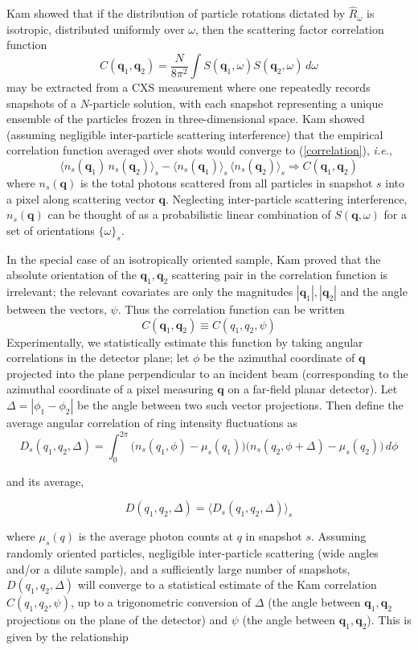 \documentclass [11pt,fleqn]{article}
\def \be {\begin{equation}}
\def \ee {\end{equation}}
\begin{document}
Kam showed that if the distribution of particle rotations dictated by $\hat{R}_\omega$ is isotropic, distributed uniformly over $\omega$, then the scattering factor correlation function
\be \label{correlation}
C(\bm q_1, \bm q_2) = \frac{N}{8 \pi^{2}}\int S( \bm q_{1},\omega ) S( \bm q_{2},\omega ) \, d \omega
\ee
may be extracted from a CXS measurement where one repeatedly records snapshots of a $N$-particle solution, with each snapshot representing a unique ensemble of the particles frozen in three-dimensional space. Kam showed (assuming negligible inter-particle scattering interference) that the empirical correlation function averaged over shots would converge to (\ref{correlation}), \textit{i.e.},
\be \label{converge}
\big \langle   n_s(\bm q_1)  \, n_s(\bm q_2) \big \rangle_s  - \big \langle {n}_s(\bm q_1) \big \rangle_s \, \big \langle {n}_s(\bm q_2) \big \rangle_s   \Rightarrow C(\bm q_1, \bm q_2) 
\ee
where $n_{s}(\bm q)$ is the total photons scattered from all particles in snapshot $s$ into a pixel along scattering vector $\bm q$. Neglecting inter-particle scattering interference, $n_{s}(\bm q)$ can be thought of as a probabilistic linear combination of $S(\bm q,\omega)$ for a set of orientations $\{ \omega\}_{s}$.

In the special case of an isotropically oriented sample, Kam proved that the absolute orientation of the $\bm q_1, \bm q_2$ scattering pair in the correlation function is irrelevant; the relevant covariates are only the magnitudes $| \bm q_1 | , | \bm q_2 | $ and the angle between the vectors, $\psi$. Thus the correlation function can be written 
\[
C(\bm q_1, \bm q_2)  \equiv C (q_1,q_2, \psi  )
\]
Experimentally, we statistically estimate this function by taking angular correlations in the detector plane; let $\phi$ be the azimuthal coordinate of $\bm q$ projected into the plane perpendicular to an incident beam (corresponding to the azimuthal coordinate of a pixel measuring $\bm q$ on a far-field planar detector). Let $\Delta = |\phi_{1} - \phi_{2}|$ be the angle between two such vector projections. Then define the average angular correlation of ring intensity fluctuations as
\be \label{angular_shot}
D_s(q_1,q_2, \Delta  ) = \int_{0}^{2\pi}  \Big ( n_s(q_1,\phi) -   \mu_s( q_1) \Big) \Big ( n_s(q_2,\phi + \Delta) -   \mu_s( q_2) \Big)  \, d\phi  
\ee

and its average,

\be \label{angular}
D(q_1,q_2, \Delta  ) = \big \langle D_s(q_1,q_2, \Delta  ) \big \rangle_{s}
\ee

where $\mu_s( q)$ is the average photon counts at $q$ in snapshot $s$. Assuming randomly oriented particles, negligible inter-particle scattering (wide angles and/or a dilute sample), and a sufficiently large number of snapshots, $D (q_1,q_2, \Delta)$ will converge to a statistical estimate of the Kam correlation $C (q_1,q_2, \psi)$, up to a trigonometric conversion of $\Delta$ (the angle between $\bm q_1, \bm q_2$ projections on the plane of the detector) and $\psi$ (the angle between $\bm q_1, \bm q_2$). This is given by the relationship
\end{document}

